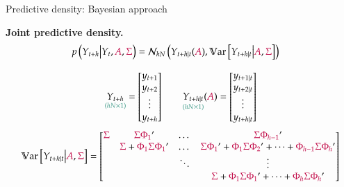 \documentclass[notes,blackandwhite,mathsans,usenames,dvipsnames]{beamer}
\begin{document}
\begin{frame}{Predictive density: Bayesian approach}

\textbf{Joint predictive density.}
\begin{align*}
p\left(Y_{t+h}\big|Y_t, {\color{purple}A},{\color{purple}\Sigma}\right)&= \mathcal{N}_{hN}\left(Y_{t+h|t}({\color{purple}A}), \mathbb{V}\text{ar}\left[Y_{t+h|t}\big| {\color{purple}A},{\color{purple}\Sigma}\right]\right)
\end{align*} 

\scriptsize\bigskip
$$ \underset{\color{mcxs2}(hN\times1)}{Y_{t+h}} = \begin{bmatrix}y_{t+1}\\ y_{t+2}\\ \vdots \\ y_{t+h} \end{bmatrix}\qquad \underset{\color{mcxs2}(hN\times1)}{Y_{t+h|t}}({\color{purple}A}) = \begin{bmatrix}y_{t+1|t}\\ y_{t+2|t}\\ \vdots \\ y_{t+h|t} \end{bmatrix} $$
$$\mathbb{V}\text{ar}\left[Y_{t+h|t}\big| {\color{purple}A},{\color{purple}\Sigma}\right] = \begin{bmatrix} 
{\color{purple}\Sigma} & {\color{purple}\Sigma \Phi_1}' & \dots & {\color{purple}\Sigma \Phi_{h-1}}' \\ 
 & {\color{purple}\Sigma} + {\color{purple}\Phi_1\Sigma \Phi_1}' & \dots & {\color{purple}\Sigma\Phi_1}' + {\color{purple}\Phi_1\Sigma\Phi_2}' + \dots +{\color{purple}\Phi_{h-1}\Sigma\Phi_h}' \\
 &  & \ddots & \vdots\\
 &&& {\color{purple}\Sigma} + {\color{purple}\Phi_1\Sigma\Phi_1}' +  \dots + {\color{purple}\Phi_h\Sigma\Phi_h}'
 \end{bmatrix} $$

\end{frame}
\end{document}
